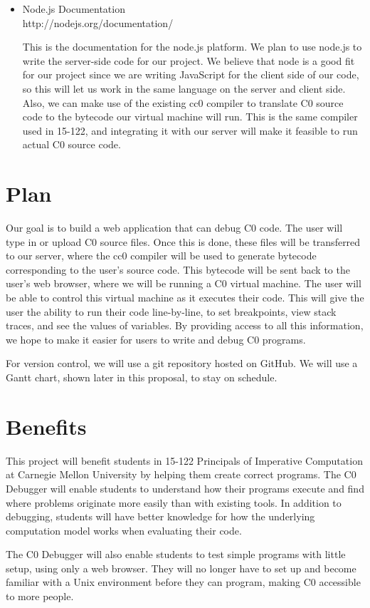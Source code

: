 \documentclass[11pt]{article}
\begin{document}
\begin{itemize}
\item Node.js Documentation\\
  http://nodejs.org/documentation/
  \par
  This is the documentation for the node.js platform.  We plan to use
  node.js to write the server-side code for our project.  We believe
  that node is a good fit for our project since we are writing
  JavaScript for the client side of our code, so this will let us work
  in the same language on the server and client side.  Also, we can
  make use of the existing cc0 compiler to translate C0 source code to
  the bytecode our virtual machine will run. This is the same compiler
  used in 15-122, and integrating it with our server will make it
  feasible to run actual C0 source code.
\end{itemize}
\section{Plan}
\par
Our goal is to build a web application that can debug C0 code.
The user will type in or upload C0 source files.
Once this is done, these files will be transferred to our server,
where the cc0 compiler will be used to
generate bytecode corresponding to the user's source code.
This bytecode will be sent back to the user's web browser,
where we will be running a C0 virtual machine.
The user will be able to control this virtual machine as it executes their code. 
This will give the user the ability to run their code line-by-line,
to set breakpoints, view stack traces, and see the values of variables.
By providing access to all this information,
we hope to make it easier for users to write and debug C0 programs.
\par
For version control, we will use a git repository hosted on GitHub. 
We will use a Gantt chart, shown later in this proposal, to stay on schedule.


\section{Benefits}
\par
This project will benefit students in 15-122 Principals of Imperative
Computation at Carnegie Mellon University by helping them create correct
programs. The C0 Debugger will enable students to understand how their programs
execute and find where problems originate more easily than with existing tools.
In addition to debugging, students will have better knowledge for how the
underlying computation model works when evaluating their code.
\par
The C0 Debugger will also enable students to test simple programs with little
setup, using only a web browser. They will no longer have to set up and become
familiar with a Unix environment before they can program, making C0 accessible
to more people.
\end{document}
